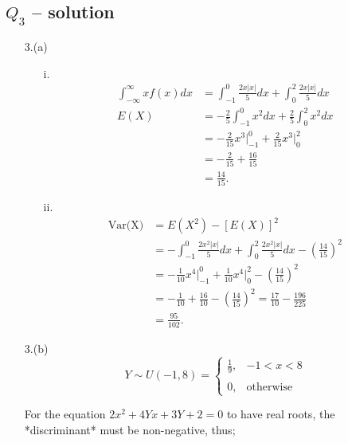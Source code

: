 \documentclass[12pt,a4paper, fleq]{article}
\begin{document}
\subsection*{$Q_{3}$ -- solution}
\begin{itemize}
\item[3.(a)]
\begin{itemize}
\item[i.]
\begin{equation*}
\begin{split}
\int_{-\infty}^\infty xf(x)dx & = \int_{-1}^0 \frac{2x|x|}{5}dx + \int_{0}^2 \frac{2x|x|}{5}dx\\[2mm]
E(X) & = -\frac25 \int_{-1}^0 x^2dx + \frac25 \int_{0}^2 x^2dx\\[2mm]
& = -\frac{2}{15}x^3\bigg\lvert_{-1}^0 + \frac{2}{15}x^3\bigg\lvert_0^2\\[2mm]
& = -\frac{2}{15} + \frac{16}{15}\\
& = \frac{14}{15}.
\end{split}
\end{equation*}

\item[ii.]
\begin{equation*}
\begin{split}
\mbox{Var(X)} & = E(X^2) - [E(X)]^2 \\[2mm]
& = -\int_{-1}^0 \frac{2x^2|x|}{5}dx + \int_{0}^2 \frac{2x^2|x|}{5}dx - \left(\frac{14}{15}\right)^2\\[2mm]
& = -\frac{1}{10}x^4\bigg\lvert_{-1}^0 + \frac{1}{10}x^4\bigg\lvert_0^2 - \left(\frac{14}{15}\right)^2\\[2mm]
& = -\frac{1}{10} + \frac{16}{10} - \left(\frac{14}{15}\right)^2 = \frac{17}{10}-\frac{196}{225}\\
& = \frac{95}{102}.
\end{split}
\end{equation*}
\end{itemize}

\item[3.(b)]
\begin{equation*}
Y\sim U(-1, 8) = 
\begin{cases}
\frac19, & -1 < x < 8\\
\\
0, & \mbox{otherwise}
\end{cases}
\end{equation*}

For the equation $2x^2 + 4Yx + 3Y+2 = 0$ to have real roots, the *discriminant* must be non-negative, thus;


\end{itemize}
\end{document}
